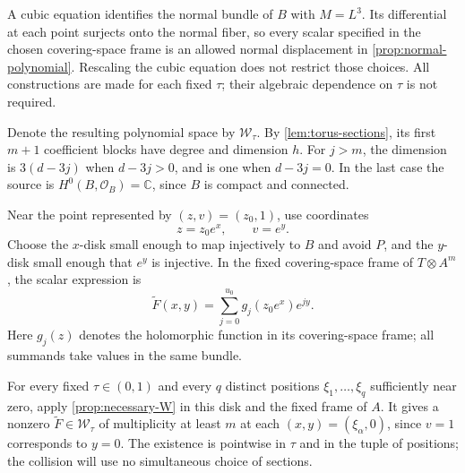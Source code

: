 A cubic equation identifies the normal bundle of $B$ with $M=L^3$. Its differential at each point surjects onto the normal fiber, so every scalar specified in the chosen covering-space frame is an allowed normal displacement in \cref{prop:normal-polynomial}. Rescaling the cubic equation does not restrict those choices. All constructions are made for each fixed $\tau$; their algebraic dependence on $\tau$ is not required.

Denote the resulting polynomial space by $\mathcal{W}_\tau$. By \cref{lem:torus-sections}, its first $m+1$ coefficient blocks have degree and dimension $h$. For $j>m$, the dimension is $3(d-3j)$ when $d-3j>0$, and is one when $d-3j=0$. In the last case the source is $H^0(B,\mathcal{O}_B)=\mathbb{C}$, since $B$ is compact and connected.

Near the point represented by $(z,v)=(z_0,1)$, use coordinates
\begin{equation}
 z=z_0e^x,\qquad v=e^y.
\label{eq:local-chart}
\end{equation}
Choose the $x$-disk small enough to map injectively to $B$ and avoid $P$, and the $y$-disk small enough that $e^y$ is injective. In the fixed covering-space frame of $T\otimes A^m$, the scalar expression is
\[
 \widetilde F(x,y)=\sum_{j=0}^{u_0}g_j(z_0e^x)e^{jy}.
\]
Here $g_j(z)$ denotes the holomorphic function in its covering-space frame; all summands take values in the same bundle.

For every fixed $\tau\in(0,1)$ and every $q$ distinct positions $\xi_1,\ldots,\xi_q$ sufficiently near zero, apply \cref{prop:necessary-W} in this disk and the fixed frame of $A$. It gives a nonzero $\widetilde F\in\mathcal{W}_\tau$ of multiplicity at least $m$ at each $(x,y)=(\xi_\alpha,0)$, since $v=1$ corresponds to $y=0$. The existence is pointwise in $\tau$ and in the tuple of positions; the collision will use no simultaneous choice of sections.
